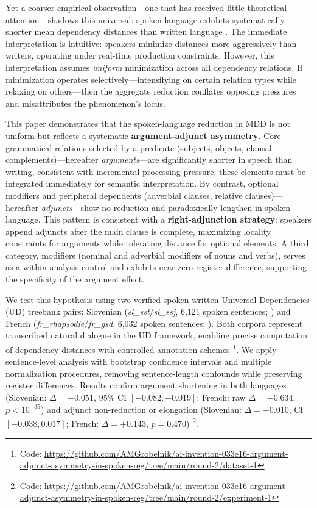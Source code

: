 \documentclass[11pt,letterpaper]{article}
\begin{document}
Yet a coarser empirical observation---one that has received little theoretical attention---shadows this universal: spoken language exhibits systematically shorter mean dependency distances than written language \citep{Liu2008,Dobrovoljc2025}. The immediate interpretation is intuitive: speakers minimize distances more aggressively than writers, operating under real-time production constraints. However, this interpretation assumes \emph{uniform} minimization across all dependency relations. If minimization operates selectively---intensifying on certain relation types while relaxing on others---then the aggregate reduction conflates opposing pressures and misattributes the phenomenon's locus.

This paper demonstrates that the spoken-language reduction in MDD is not uniform but reflects a systematic \textbf{argument-adjunct asymmetry}. Core grammatical relations selected by a predicate (subjects, objects, clausal complements)---hereafter \emph{arguments}---are significantly shorter in speech than writing, consistent with incremental processing pressure: these elements must be integrated immediately for semantic interpretation. By contrast, optional modifiers and peripheral dependents (adverbial clauses, relative clauses)---hereafter \emph{adjuncts}---show no reduction and paradoxically lengthen in spoken language. This pattern is consistent with a \textbf{right-adjunction strategy}: speakers append adjuncts after the main clause is complete, maximizing locality constraints for arguments while tolerating distance for optional elements. A third category, modifiers (nominal and adverbial modifiers of nouns and verbs), serves as a within-analysis control and exhibits near-zero register difference, supporting the specificity of the argument effect.

We test this hypothesis using two verified spoken-written Universal Dependencies (UD) treebank pairs: Slovenian (\textit{sl\_sst}/\textit{sl\_ssj}, 6,121 spoken sentences; \citealt{Dobrovoljc2012}) and French (\textit{fr\_rhapsodie}/\textit{fr\_gsd}, 6,032 spoken sentences; \citealt{Lacheret2014}). Both corpora represent transcribed natural dialogue in the UD framework, enabling precise computation of dependency distances with controlled annotation schemes%
\footnote{Code: \url{https://github.com/AMGrobelnik/ai-invention-033e16-argument-adjunct-asymmetry-in-spoken-reg/tree/main/round-2/dataset-1}}.
We apply sentence-level analysis with bootstrap confidence intervals and multiple normalization procedures, removing sentence-length confounds while preserving register differences. Results confirm argument shortening in both languages (Slovenian: $\Delta = -0.051$, 95\% CI $[-0.082, -0.019]$; French: raw $\Delta = -0.634$, $p < 10^{-35}$) and adjunct non-reduction or elongation (Slovenian: $\Delta = -0.010$, CI $[-0.038, 0.017]$; French: $\Delta = +0.143$, $p = 0.470$)%
\footnote{Code: \url{https://github.com/AMGrobelnik/ai-invention-033e16-argument-adjunct-asymmetry-in-spoken-reg/tree/main/round-2/experiment-1}}.
\end{document}
